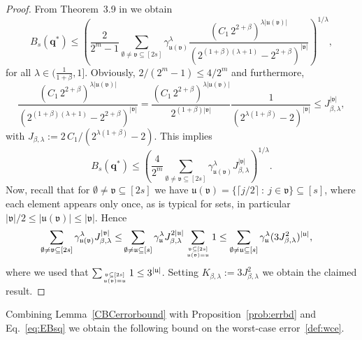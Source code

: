 \documentclass[namedate,webpdf,imanum]{ima-authoring-arxiv}%
\theoremstyle{thmstyletwo}%
\numberwithin{equation}{section}
\newcommand{\bsq}{\boldsymbol{q}}
\newcommand{\uu}{\mathfrak{u}}
\newcommand{\vv}{\mathfrak{v}}
\begin{document}
\begin{proof}
From Theorem~3.9 in \cite{DKLNS14} we obtain
\begin{equation*}
B_s(\bsq^\ast) \leq \left( \frac{2}{2^m-1} \sum_{\emptyset \not= \vv \subseteq [2s]} \gamma_{\uu(\vv)}^\lambda \frac{ (C_1 \, 2^{2+\beta})^{\lambda|\uu(\vv)|}}{ (2^{(1+\beta) (\lambda+1)} - 2^{2+\beta})^{|\vv|}} \right)^{1/\lambda},
\end{equation*}
for all $ \lambda \in ( \frac{1}{1+\beta}, 1]$. Obviously, $2/(2^m-1)\le 4/2^m$ and furthermore, 
$$
\frac{(C_1 \, 2^{2+\beta})^{\lambda|\uu(\vv)|}}{ (2^{(1+\beta) (\lambda+1)} - 2^{2+\beta})^{|\vv|}} =  \frac{(C_1 \, 2^{2+\beta})^{\lambda|\uu(\vv)|}}{2^{(1+\beta)|\vv|}} \frac{1}{(2^{\lambda (1+\beta)} - 2)^{|\vv|}}
\le J_{\beta,\lambda}^{|\vv|},
$$
with $J_{\beta,\lambda}:=2\, C_1 / (2^{\lambda (1+\beta)} - 2)$. This implies 
\begin{equation*}%
B_s(\bsq^\ast) \leq \left( \frac{4}{2^m} \sum_{\emptyset \not= \vv \subseteq [2s]} \gamma_{\uu(\vv)}^\lambda J_{\beta,\lambda}^{|\vv|} \right)^{1/\lambda}.
\end{equation*}
Now, recall that for $\emptyset \not=\vv \subseteq [2 s]$ we have $\uu(\vv)=\{\lceil j/2\rceil \ : \ j \in \vv\} \subseteq [s]$, where each element appears only once, as is typical for sets, in particular $|\vv|/2 \le |\uu(\vv)| \le | \vv|$. Hence
\begin{align*}
\sum_{\emptyset \not= \vv \subseteq [2s]} \gamma_{\uu(\vv)}^\lambda J_{\beta,\lambda}^{|\vv|} \le &  \sum_{\emptyset \not= \uu \subseteq [s]} \gamma_{\uu}^\lambda J_{\beta,\lambda}^{2 |\uu|} \sum_{\vv \subseteq [2s] \atop \uu(\vv)=\uu} 1 \le \sum_{\emptyset \not= \uu \subseteq [s]} \gamma_{\uu}^\lambda (3 J_{\beta,\lambda}^2)^{|\uu|},  
\end{align*}
where we used that $\sum_{\vv \subseteq [2s] \atop \uu(\vv)=\uu} 1 \le 3^{|\uu|}$. Setting $K_{\beta,\lambda}:=3 J_{\beta,\lambda}^2$ we obtain the claimed result.
\end{proof}

Combining Lemma~\ref{CBCerrorbound} with Proposition~\ref{prob:errbd} and Eq.~\eqref{eq:EBsq} we obtain the following bound on the worst-case error~\eqref{def:wce}. %
\end{document}
